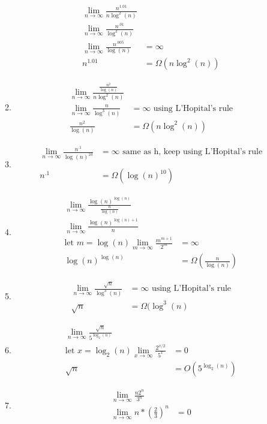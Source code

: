 \documentclass[11pt]{article}
\begin{document}
\begin{enumerate}
\begin{enumerate}
\begin{align*}
\lim_{n\to\infty} \frac{n^{1.01}}{n\log^2(n)}\\
\lim_{n\to\infty} \frac{n^{.01}}{\log^2(n)}\\
\lim_{n\to\infty} \frac{n^{.005}}{\log(n)}&=\infty\\
n^{1.01}&=\Omega(n\log^2(n))
\end{align*}
\item
\begin{align*}
\lim_{n\to\infty} \frac{\frac{n^2}{\log(n)}}{n\log^2(n)}\\
\lim_{n\to\infty} \frac{n}{\log^3(n)}&=\infty\text{ using L'Hopital's rule}\\
\frac{n^2}{\log(n)}&=\Omega(n\log^2(n))
\end{align*}
\item
\begin{align*}
\lim_{n\to\infty} \frac{n^{.1}}{\log(n)^{10}}&=\infty \text{ same as h, keep using L'Hopital's rule}\\\\
n^{.1}&=\Omega(\log(n)^{10})
\end{align*}
\item
\begin{align*}
\lim_{n\to\infty} \frac{\log(n)^{\log(n)}}{\frac{n}{\log(n)}} \\
\lim_{n\to\infty} \frac{\log(n)^{\log(n)+1}}{n}\\
\text{let } m=\log(n)\lim_{m\to\infty}\frac{m^{m+1}}{2^m}&=\infty\\
\log(n)^{\log(n)} &= \Omega(\frac{n}{\log(n)})
\end{align*}
\item
\begin{align*}
\lim_{n\to\infty} \frac{\sqrt{n}}{\log^3(n)}&=\infty \text{ using L'Hopital's rule}\\
\sqrt{n}&=\Omega(\log^3(n)
\end{align*}
\item
\begin{align*}
\lim_{n\to\infty} \frac{\sqrt{n}}{5^{\log_2(n)}}\\
\text{let } x=\log_2(n)\lim_{x\to\infty} \frac{2^{x/2}}{5^x}&=0\\
\sqrt{n}&=O(5^{\log_2(n)})
\end{align*}
\item
\begin{align*}
\lim_{n\to\infty} \frac{n2^n}{3^n}\\
\lim_{n\to\infty} n*\left(\frac{2}{3}\right)^n&=0\\

\end{align*}
\end{enumerate}
\end{enumerate}
\end{document}
